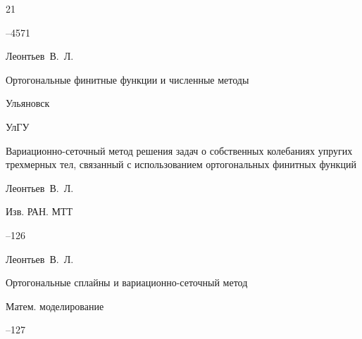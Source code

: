 \begin{thebibliography}{21}


--4571





\by Леонтьев~В.~Л. 

\book Ортогональные финитные функции и численные методы 

\publaddr Ульяновск 

\publ УлГУ 






\paper Вариационно-сеточный метод решения задач о собственных колебаниях упругих трехмерных тел, связанный с использованием ортогональных финитных функций 

\by Леонтьев~В.~Л. 

\jour Изв. РАН. МТТ



--126





\by Леонтьев~В.~Л.

\paper Ортогональные сплайны и вариационно-сеточный метод

\jour Матем. моделирование




--127










\end{thebibliography}

